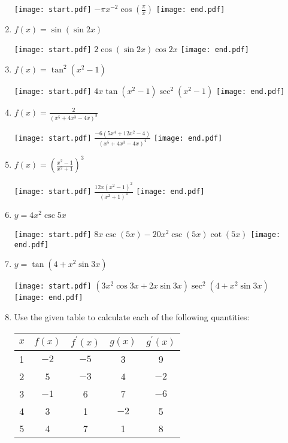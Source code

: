 \documentclass[12pt]{article}
\begin{document}
\begin{enumerate}
\texttt{[image: start.pdf]}
{{$-\pi x^{-2}\cos{\left(\frac{\pi}{x}\right)}$}}
\texttt{[image: end.pdf]}


\item $f(x) = \sin{(\sin{2x})}$ 

\texttt{[image: start.pdf]}
{{$2\cos{(\sin{2x})}\cos{2x}$}}
\texttt{[image: end.pdf]}


\item $f(x) = \tan^2{(x^2-1)}$ 

\texttt{[image: start.pdf]}
{{$4x\tan{(x^2-1)}\sec^2{(x^2-1)}$}}
\texttt{[image: end.pdf]}


\item $f(x) = \frac{2}{(x^5+4x^3-4x)^3}$ 

\texttt{[image: start.pdf]}
{{$\frac{-6(5x^4+12x^2-4)}{(x^5+4x^3-4x)^4}$}}
\texttt{[image: end.pdf]}


\item $f(x) = \left(\frac{x^2-1}{x^2+1}\right)^3$ 

\texttt{[image: start.pdf]}
{{$\frac{12x(x^2-1)^2}{(x^2+1)^4}$}}
\texttt{[image: end.pdf]}


\item $y=4x^2\csc{5x}$

\texttt{[image: start.pdf]}
{{$8x\csc{(5x)}-20x^2\csc{(5x)}\cot{(5x)}$}}
\texttt{[image: end.pdf]}


\item $y=\tan{(4+x^2\sin{3x})}$

\texttt{[image: start.pdf]}
{{$\left(3x^2\cos{3x}+2x\sin{3x}\right)\sec^2{\left(4+x^2\sin{3x}\right)}$}}
\texttt{[image: end.pdf]}


\item Use the given table to calculate each of the following quantities:

\begin{center}
\begin{tabular}{c|c|c|c|c}
$x$ & $f(x)$ & $f^{\prime}(x)$ & $g(x)$ & $g^{\prime}(x)$\\
\hline
1 & $-2$ & $-5$ & 3 & 9\\
2& 5 & $-3$ & 4 & $-2$\\
3 & $-1$ & 6  & 7 & $-6$\\
4 & 3 & 1 & $-2$ & 5\\
5 & 4 & 7 & 1 & 8
\end{tabular}
\end{center}


\end{enumerate}
\end{document}
